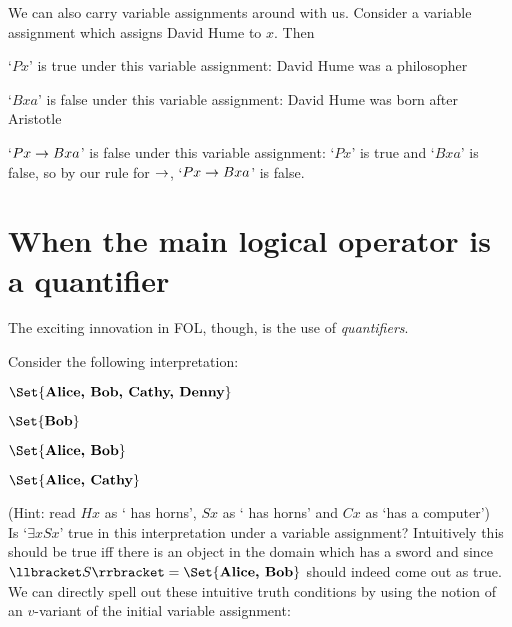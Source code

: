 We can also carry variable assignments around with us. Consider a variable assignment which assigns David Hume to $x$. Then \begin{ebullet}
\item `$Px$' is true under this variable assignment: David Hume was a philosopher
\item `$Bxa$' is false under this variable assignment: David Hume was born after Aristotle
\item `$Px\rightarrow Bxa$' is false under this variable assignment: `$Px$' is true and `$Bxa$' is false, so by our rule for $\rightarrow$, `$Px\rightarrow Bxa$' is false.
\end{ebullet}


\section{When the main logical operator is a quantifier}
The exciting innovation in FOL, though, is the use of \emph{quantifiers}.

Consider the following interpretation:
\begin{center}

\begin{interp}\item[\domain] $\Set{\text{\emph{Alice, Bob, Cathy, Denny}}}$
\item[\denote{H}] $\Set{\text{\emph{Bob}}}$
\item[\denote{S}] $\Set{\text{\emph{Alice, Bob}}}$
\item[\denote{C}]$\Set{\text{\emph{Alice, Cathy}}}$
\end{interp}
\end{center}
(Hint: read $Hx$ as ` has horns', $Sx$ as ` has horns' and $Cx$ as `has a computer')\\

\noindent Is `$\exists x Sx$' true in this interpretation under a variable assignment? Intuitively this should be true iff there is an object in the domain which has a sword and since $\denote{S}=\Set{\text{\emph{Alice, Bob}}}$ should indeed come out as true. We can directly spell out these intuitive truth conditions by using the notion of an  $v$-variant of the initial variable assignment:

